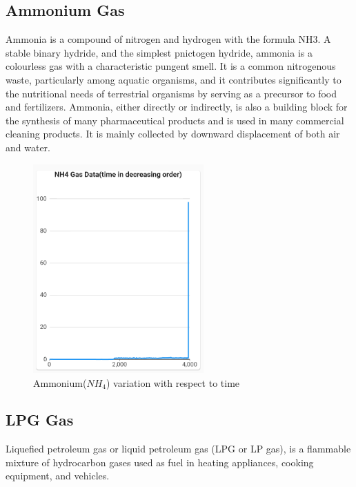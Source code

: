 \subsection{Ammonium Gas}
Ammonia is a compound of nitrogen and hydrogen with the formula NH3. A stable binary hydride, and the simplest pnictogen hydride, ammonia is a colourless gas with a characteristic pungent smell. It is a common nitrogenous waste, particularly among aquatic organisms, and it contributes significantly to the nutritional needs of terrestrial organisms by serving as a precursor to food and fertilizers. Ammonia, either directly or indirectly, is also a building block for the synthesis of many pharmaceutical products and is used in many commercial cleaning products. It is mainly collected by downward displacement of both air and water.
\begin{figure}[!ht]
\centering
\includegraphics[width=\linewidth,height=8cm]{figures/NH4.png}
\caption{\label{img411} Ammonium($NH_{4}$) variation with respect to time}
\end{figure}

\subsection{LPG Gas}
Liquefied petroleum gas or liquid petroleum gas (LPG or LP gas), is a flammable mixture of hydrocarbon gases used as fuel in heating appliances, cooking equipment, and vehicles.

